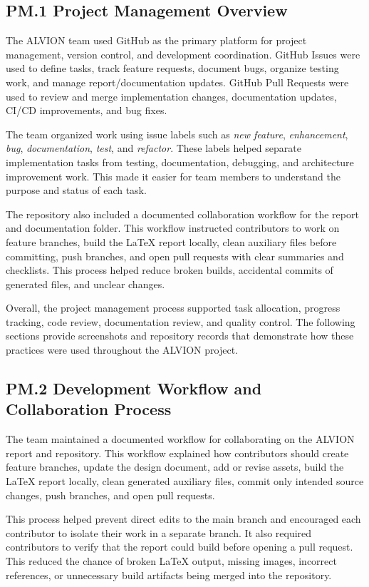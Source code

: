 \documentclass[11pt]{report}
\begin{document}
\subsection*{PM.1 Project Management Overview}

The ALVION team used GitHub as the primary platform for project management, version control, and development coordination. GitHub Issues were used to define tasks, track feature requests, document bugs, organize testing work, and manage report/documentation updates. GitHub Pull Requests were used to review and merge implementation changes, documentation updates, CI/CD improvements, and bug fixes.

The team organized work using issue labels such as \textit{new feature}, \textit{enhancement}, \textit{bug}, \textit{documentation}, \textit{test}, and \textit{refactor}. These labels helped separate implementation tasks from testing, documentation, debugging, and architecture improvement work. This made it easier for team members to understand the purpose and status of each task.

The repository also included a documented collaboration workflow for the report and documentation folder. This workflow instructed contributors to work on feature branches, build the LaTeX report locally, clean auxiliary files before committing, push branches, and open pull requests with clear summaries and checklists. This process helped reduce broken builds, accidental commits of generated files, and unclear changes.

Overall, the project management process supported task allocation, progress tracking, code review, documentation review, and quality control. The following sections provide screenshots and repository records that demonstrate how these practices were used throughout the ALVION project.

\subsection*{PM.2 Development Workflow and Collaboration Process}

The team maintained a documented workflow for collaborating on the ALVION report and repository. This workflow explained how contributors should create feature branches, update the design document, add or revise assets, build the LaTeX report locally, clean generated auxiliary files, commit only intended source changes, push branches, and open pull requests.

This process helped prevent direct edits to the main branch and encouraged each contributor to isolate their work in a separate branch. It also required contributors to verify that the report could build before opening a pull request. This reduced the chance of broken LaTeX output, missing images, incorrect references, or unnecessary build artifacts being merged into the repository.
\end{document}
